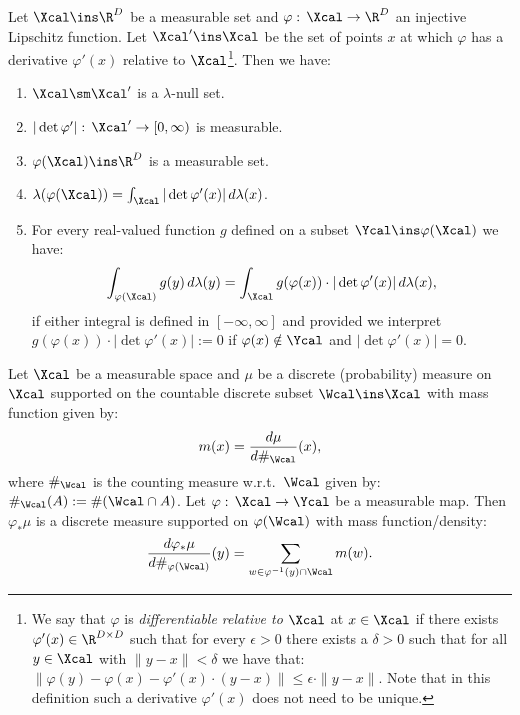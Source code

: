 \begin{Thm}
    Let $\Xcal \ins \R^D$ be a measurable set 
    and $\varphi:\, \Xcal \to \R^D$ an injective Lipschitz function.
Let $\Xcal' \ins \Xcal$ be the set of points $x$ at which $\varphi$ has a derivative $\varphi'(x)$ relative to $\Xcal$\footnote{We say that $\varphi$ is \emph{differentiable relative to $\Xcal$} at $x \in \Xcal$  if there exists  $\varphi'(x) \in \R^{D \times D}$ such that for every $\epsilon >0$ there exists a $\delta >0$ such that for all
    $y \in \Xcal$ with $\|y-x\| < \delta$  we have that: 
$\|\varphi(y)-\varphi(x) - \varphi'(x) \cdot (y-x) \| \le \epsilon \cdot \|y-x\| $. Note that in this definition such a derivative $\varphi'(x)$ does not need to be unique.}.
Then we have:
    \begin{enumerate}
        \item $\Xcal \sm \Xcal'$ is a $\lambda$-null set.
        \item $|\det \varphi'|:\, \Xcal' \to [0,\infty)$ is measurable.
        \item $\varphi(\Xcal) \ins \R^D$ is a measurable set.
        \item $\lambda(\varphi(\Xcal)) = \int_\Xcal |\det \varphi'(x)| \,d\lambda(x)$.
        \item For every real-valued function $g$ defined on a subset $\Ycal \ins \varphi(\Xcal)$
            we have:
            \[ \int_{\varphi(\Xcal)} g(y)\,d\lambda(y) = \int_\Xcal g(\varphi(x)) \cdot |\det \varphi'(x)| \, d\lambda(x),  \]
            if either integral is defined in $[-\infty,\infty]$ and provided we interpret
            $g(\varphi(x)) \cdot |\det \varphi'(x)| := 0$ if $\varphi(x) \notin \Ycal$ and $|\det \varphi'(x)| =0$. 
    \end{enumerate}
\end{Thm}


\begin{Rem}
    Let $\Xcal$ be a measurable space and $\mu$ be a discrete (probability) measure on $\Xcal$ supported on the countable discrete subset $\Wcal \ins \Xcal$ with mass function given by:
    \[ m(x) = \frac{d\mu}{d\#_\Wcal}(x),\]
    where $\#_\Wcal$ is the counting measure w.r.t.\ $\Wcal$ given by: $\#_\Wcal(A) := \#(\Wcal \cap A)$.
    Let $\varphi:\,\Xcal \to \Ycal$ be a measurable map. Then $\varphi_*\mu$ is a discrete measure supported on $\varphi(\Wcal)$ 
    with mass function/density:
    \[ \frac{d\varphi_*\mu}{d\#_{\varphi(\Wcal)}}(y) = \sum_{ w \in \varphi^{-1}(y) \cap \Wcal } m(w).
    \]
\end{Rem}

